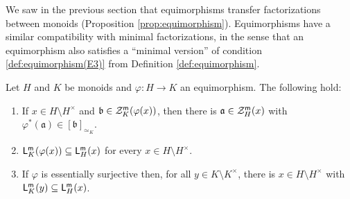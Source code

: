 %
We saw in the previous section that equimorphisms transfer factorizations between monoids (Proposition \ref{prop:equimorphism}).  
Equimorphisms have a similar compatibility with minimal factorizations, in the sense that an equimorphism also satisfies a ``minimal version'' of condition \ref{def:equimorphism(E3)} from Definition \ref{def:equimorphism}.
%
%
%
\begin{prop}\label{prop:min-equi}
	Let $H$ and $K$ be monoids and $\varphi: H\to K$ an equimorphism. The following hold: 
	\begin{enumerate}[label={\rm (\roman{*})}]
		\item\label{it:prop:min-equi(i)} If $x\in H \setminus H^\times$ and $\mathfrak{b}\in \mathcal{Z}_K^{\mathsf{m}}(\varphi(x))$, then there is $\mathfrak{a}\in \mathcal{Z}_H^{\mathsf{m}}(x)$ with $\varphi^*(\mathfrak{a})\in [ \mathfrak{b} ]_{\simeq_K}$.
		\item\label{it:prop:min-equi(ii)} $\mathsf{L}_K^{\mathsf{m}}(\varphi(x)) \subseteq \mathsf{L}_H^{\mathsf{m}}(x)$ for every $x\in H\setminus H^\times$.
		\item\label{it:prop:min-equi(iii)} If $\varphi$ is essentially surjective then, for all $y\in K\setminus K^\times$, there is $x\in H\setminus H^\times$ with $\mathsf{L}_K^{\mathsf{m}}(y) \subseteq \mathsf{L}_H^{\mathsf{m}}(x)$. 
	\end{enumerate}
\end{prop}
%

